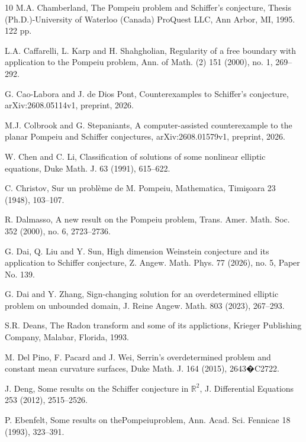\documentclass[12pt]{article}
\numberwithin{equation}{section}
\numberwithin{equation}{section}
\begin{document}
\begin{thebibliography}{10}
 M.A. Chamberland, The Pompeiu problem and Schiffer's conjecture, Thesis (Ph.D.)-University of Waterloo (Canada) ProQuest LLC, Ann Arbor, MI, 1995. 122 pp.

 L.A. Caffarelli, L. Karp and H. Shahgholian, Regularity of a free boundary with application to the Pompeiu problem,
Ann. of Math. (2) 151 (2000), no. 1, 269--292.

 G. Cao-Labora and J. de Dios Pont, Counterexamples to Schiffer's conjecture, arXiv:2608.05114v1, preprint, 2026.

 M.J. Colbrook and G. Stepaniants, A computer-assisted counterexample to the planar Pompeiu and Schiffer
conjectures, arXiv:2608.01579v1, preprint, 2026.


 W. Chen and C. Li, Classification of solutions of some nonlinear elliptic equations, Duke Math. J. 63 (1991), 615--622.

 C. Christov, Sur un probl\`{e}me de M. Pompeiu, Mathematica, Timi\c{s}oara 23 (1948), 103--107.

 R. Dalmasso, A new result on the Pompeiu problem, Trans. Amer. Math. Soc. 352 (2000), no. 6, 2723--2736.

 G. Dai, Q. Liu and Y. Sun, High dimension Weinstein conjecture and its application to Schiffer conjecture, Z. Angew. Math. Phys. 77 (2026), no. 5, Paper No. 139.

 G. Dai and Y. Zhang, Sign-changing solution for an overdetermined elliptic problem on unbounded domain, J. Reine Angew. Math. 803 (2023), 267--293.

 S.R. Deans, The Radon transform and some of its applictions, Krieger
Publishing Company, Malabar, Florida, 1993.

 M. Del Pino, F. Pacard and J. Wei, Serrin's overdetermined problem and constant mean curvature surfaces, Duke Math. J. 164 (2015), 2643�C2722.

 J. Deng, Some results on the Schiffer conjecture in $\mathbb{R}^2$, J. Differential Equations 253 (2012), 2515--2526.

 P. Ebenfelt,  Some results on thePompeiuproblem, Ann. Acad. Sci. Fennicae 18
(1993), 323--391.


\end{thebibliography}
\end{document}
